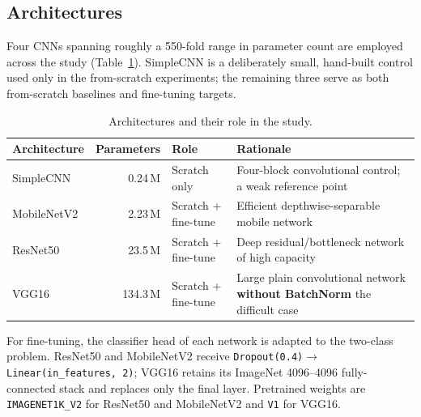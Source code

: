 \documentclass[11pt,a4paper]{article}
\numberwithin{figure}{section}
\numberwithin{table}{section}
\begin{document}
\subsection{Architectures}
Four CNNs spanning roughly a 550-fold range in parameter count are employed across the study
(Table~\ref{tab:arch}). SimpleCNN is a deliberately small, hand-built control used only in the
from-scratch experiments; the remaining three serve as both from-scratch baselines and fine-tuning
targets.

\begin{table}[H]
\centering
\caption{Architectures and their role in the study.}
\label{tab:arch}
\begin{tabularx}{\textwidth}{lrlX}
\toprule
Architecture & Parameters & Role & Rationale \\
\midrule
SimpleCNN & 0.24\,M & Scratch only & Four-block convolutional control; a weak reference point \\
MobileNetV2 \cite{mobilenet} & 2.23\,M & Scratch + fine-tune & Efficient depthwise-separable mobile network \\
ResNet50 \cite{resnet} & 23.5\,M & Scratch + fine-tune & Deep residual/bottleneck network of high capacity \\
VGG16 \cite{vgg} & 134.3\,M & Scratch + fine-tune & Large plain convolutional network \textbf{without BatchNorm} the difficult case \\
\bottomrule
\end{tabularx}
\end{table}

For fine-tuning, the classifier head of each network is adapted to the two-class problem. ResNet50 and
MobileNetV2 receive \texttt{Dropout(0.4)$\rightarrow$Linear(in\_features,\,2)}; VGG16 retains its
ImageNet 4096--4096 fully-connected stack and replaces only the final layer. Pretrained weights are
\texttt{IMAGENET1K\_V2} for ResNet50 and MobileNetV2 and \texttt{V1} for VGG16.
\end{document}
